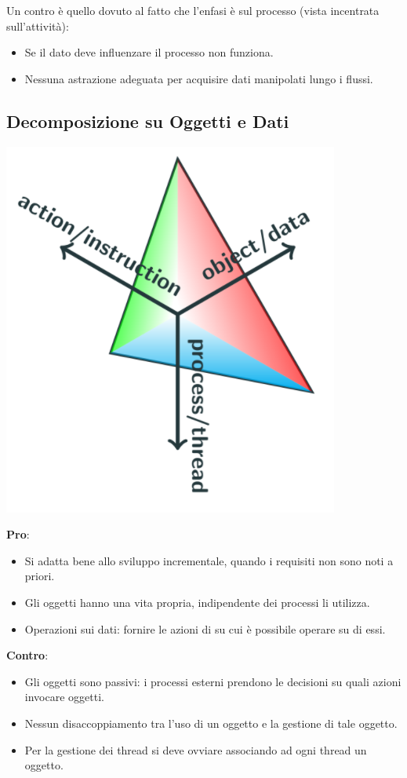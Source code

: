 Un contro è quello dovuto al fatto che l'enfasi è sul processo (vista incentrata sull'attività):
\begin{itemize}
    \item Se il dato deve influenzare il processo non funziona.
    \item Nessuna astrazione adeguata per acquisire dati manipolati lungo i flussi.
\end{itemize}

\subsection{Decomposizione su Oggetti e Dati}
\begin{center}
    \includegraphics[scale=0.4]{images/triangolo di meyer oggetti.PNG}
\end{center}
\textbf{Pro}:
\begin{itemize}
    \item  Si adatta bene allo sviluppo incrementale, quando i requisiti non sono noti a priori.
    \item Gli oggetti hanno una vita propria, indipendente dei processi li utilizza.
    \item Operazioni sui dati: fornire le azioni di su cui è possibile operare su di essi.
\end{itemize}
\textbf{Contro}:
\begin{itemize}
    \item  Gli oggetti sono passivi: i processi esterni prendono le decisioni su quali azioni invocare oggetti.
    \item Nessun disaccoppiamento tra l'uso di un oggetto e la gestione di tale oggetto.
    \item Per la gestione dei thread si deve ovviare associando ad ogni thread un oggetto.
\end{itemize}

